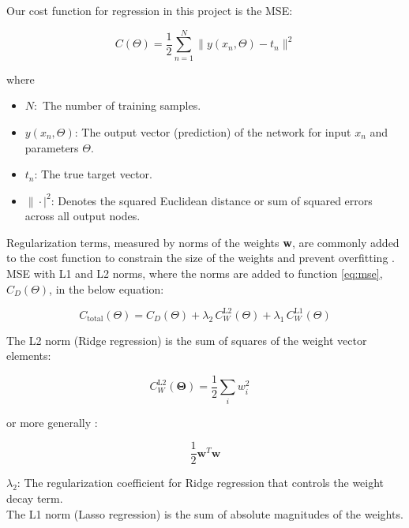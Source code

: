 \documentclass[amssymb,twocolumn,aps,floatfix]{revtex4-2}
\begin{document}
Our cost function for regression in this project is the MSE: 

\begin{equation}
    C(\Theta) = \frac{1}{2} \sum_{n=1}^{N} \| y(x_n, \Theta) - t_n \|^2
    \label{eq:mse}
\end{equation}

where 

\begin{itemize}
    \item $N:$ The number of training samples. 
    \item $y(x_n, \Theta)$: The output vector (prediction) of the network for input $x_n$ and parameters $\Theta$. 
    \item $t_n$: The true target vector. 
    \item $\| \cdot|^2$: Denotes the squared Euclidean distance or sum of squared errors across all output nodes. 
\end{itemize}

Regularization terms, measured by norms of the weights \textbf{w}, are commonly added to the cost function to constrain the size of the weights and prevent overfitting \cite{compfys_ch14}. MSE with L1 and L2 norms, where the norms are added to function \ref{eq:mse}, $C_{D}(\Theta)$, in the below equation: 

\begin{equation}
    C_{\text{total}}(\Theta)
= C_{D}(\Theta)
+ \lambda_{2} \, C_{W}^{\text{L2}}(\Theta)
+ \lambda_{1} \, C_{W}^{\text{L1}}(\Theta)
\label{eq:mse_norms}
\end{equation}

The L2 norm (Ridge regression) is the sum of squares of the weight vector elements: 

\begin{equation}
    C_{W}^{\text{L2}}(\mathbf{\Theta}) = \frac{1}{2} \sum_{i} w_i^2 \quad
\end{equation}

or more generally \citep[p.144]{bishop2006pattern}: 

\begin{equation}
    \frac{1}{2} \mathbf{w}^T \mathbf{w}
\end{equation}

$\lambda_2$: The regularization coefficient for Ridge regression that controls the weight decay term. \\

The L1 norm (Lasso regression) is the sum of absolute magnitudes of the weights.   \\
\end{document}
